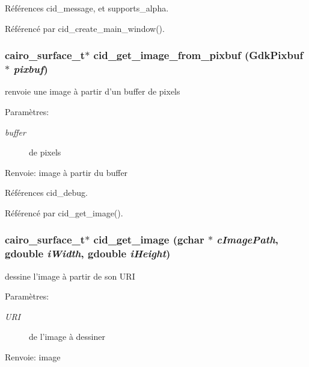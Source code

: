 Références cid\_\-message, et supports\_\-alpha.

Référencé par cid\_\-create\_\-main\_\-window().
\subsubsection{\setlength{\rightskip}{0pt plus 5cm}cairo\_\-surface\_\-t$\ast$ cid\_\-get\_\-image\_\-from\_\-pixbuf (GdkPixbuf $\ast$ {\em pixbuf})}\label{cid-main_8h_8f4f280d9555d90279fb07216621a565}


renvoie une image à partir d'un buffer de pixels \begin{Desc}
\item[Paramètres:]
\begin{description}
\item[{\em buffer}]de pixels \end{description}
\end{Desc}
\begin{Desc}
\item[Renvoie:]image à partir du buffer \end{Desc}


Références cid\_\-debug.

Référencé par cid\_\-get\_\-image().
\subsubsection{\setlength{\rightskip}{0pt plus 5cm}cairo\_\-surface\_\-t$\ast$ cid\_\-get\_\-image (gchar $\ast$ {\em cImagePath}, \/  gdouble {\em iWidth}, \/  gdouble {\em iHeight})}\label{cid-main_8h_6dc56a26a96403d692ae71b7149041d6}


dessine l'image à partir de son URI \begin{Desc}
\item[Paramètres:]
\begin{description}
\item[{\em URI}]de l'image à dessiner \end{description}
\end{Desc}
\begin{Desc}
\item[Renvoie:]image \end{Desc}
